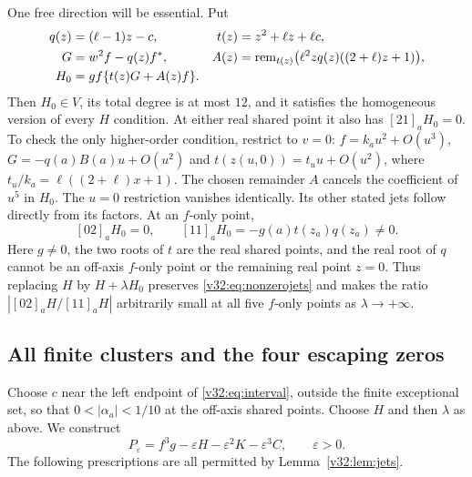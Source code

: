 \documentclass[UTF8,11pt]{ctexart}
\theoremstyle{definition}
\numberwithin{equation}{section}
\begin{document}
One free direction will be essential. Put
\begin{align}
 q(z)&=(\ell-1)z-c,& t(z)&=z^2+\ell z+\ell c,\notag\\
 G&=w^2f-q(z)f^*,&
 A(z)&=\operatorname{rem}_{t(z)}
       \bigl(\ell^2zq(z)((2+\ell)z+1)\bigr),\notag\\
 H_0&=gf\{t(z)G+A(z)f\}.             \label{v32:eq:freedirection}
\end{align}
Then $H_0\in V$, its total degree is at most $12$, and it
satisfies the homogeneous version of every $H$ condition.
At either real shared point it also has $[21]_aH_0=0$.
To check the only higher-order condition, restrict to $v=0$:
$f=k_a u^2+O(u^3)$, $G=-q(a)B(a)u+O(u^2)$ and
$t(z(u,0))=t_u u+O(u^2)$, where
$t_u/k_a=\ell((2+\ell)x+1)$. The chosen remainder $A$
cancels the coefficient of $u^5$ in $H_0$.
The $u=0$ restriction vanishes identically. Its other stated
jets follow directly from its factors.
At an $f$-only point,
\begin{equation}\label{v32:eq:dominantmixed}
 [02]_aH_0=0,\qquad [11]_aH_0=-g(a)t(z_a)q(z_a)\ne0.
\end{equation}
Here $g\ne0$, the two roots of $t$ are the real shared points,
and the real root of $q$ cannot be an off-axis $f$-only point
or the remaining real point $z=0$. Thus replacing $H$ by
$H+\lambda H_0$ preserves \eqref{v32:eq:nonzerojets} and makes
the ratio $|[02]_aH/[11]_aH|$ arbitrarily small at all five
$f$-only points as $\lambda\to+\infty$.

\subsection{All finite clusters and the four escaping zeros}

Choose $c$ near the left endpoint of \eqref{v32:eq:interval},
outside the finite exceptional set, so that
$0<|\alpha_a|<1/10$ at the off-axis shared points.
Choose $H$ and then $\lambda$ as above. We construct
\begin{equation}\label{v32:eq:global}
 P_\varepsilon=f^3g-\varepsilon H-\varepsilon^2K
                      -\varepsilon^3C,\qquad\varepsilon>0.
\end{equation}
The following prescriptions are all permitted by
Lemma~\ref{v32:lem:jets}.
\end{document}
